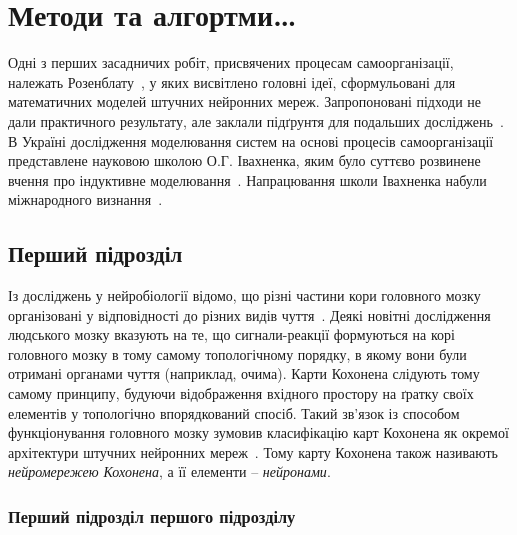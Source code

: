 \chapter{Методи та алгортми\ldots}\label{ch:02}

Одні з перших засадничих робіт, присвячених процесам самоорганізації, належать Розенблату~\cite{Ros1963}, у яких висвітлено головні ідеї, сформульовані для математичних моделей штучних нейронних мереж. Запропоновані підходи не дали практичного результату, але заклали підґрунтя для  подальших досліджень~\cite{ShlHlav2004}. В Україні дослідження моделювання систем на основі процесів самоорганізації представлене науковою школою О.Г. Івахненка, яким було суттєво розвинене вчення про індуктивне моделювання~\cite{Iva1982}. Напрацювання школи Івахненка набули міжнародного визнання~\cite{MaIv1994}.

\section{Перший підрозділ}\label{ch:0201}

Із досліджень у нейробіології відомо, що різні частини кори головного мозку організовані у відповідності до різних видів чуття~\cite{Koh2001}. Деякі новітні дослідження людського мозку вказують на те, що сигнали-реакції формуються на корі головного мозку в тому самому топологічному порядку, в якому вони були отримані органами чуття (наприклад, очима). Карти Кохонена слідують тому самому принципу, будуючи відображення вхідного простору на ґратку своїх елементів у топологічно впорядкований спосіб. Такий зв'язок із способом функціонування головного мозку зумовив класифікацію карт Кохонена як окремої архітектури штучних нейронних мереж~\cite{RMS1992}. Тому карту Кохонена також називають \emph{нейромережею Кохонена}, а її елементи -- \emph{нейронами}.

\subsection{Перший підрозділ першого підрозділу}

